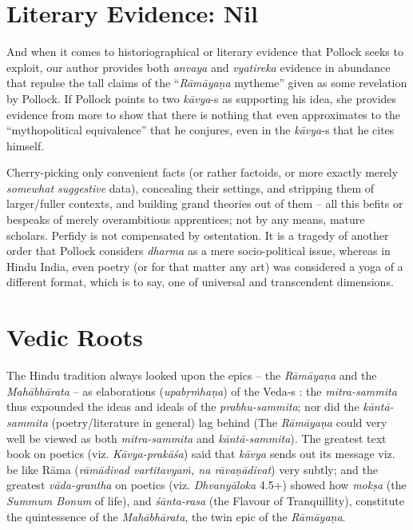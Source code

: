 \section*{Literary Evidence: Nil}

And when it comes to historiographical or literary evidence that Pollock seeks to exploit, our author provides both {\sl anvaya} and {\sl vyatireka} evidence in abundance that repulse the tall claims of  the “{\sl Rāmāyaṇa} mytheme” given as some revelation by Pollock. If Pollock points to two {\sl kāvya}-s as supporting his idea, she provides evidence from more to show that there is nothing that even approximates to the “mythopolitical equivalence” that he conjures, even in the {\sl kāvya}-s that he cites himself.

Cherry-picking only convenient facts (or rather factoids, or more exactly merely {\sl somewhat suggestive} data), concealing their settings, and stripping them of larger/fuller contexts, and building grand theories out of them -- all this befits or bespeaks of merely overambitious apprentices; not by any means, mature scholars. Perfidy is not compensated by ostentation. It is a tragedy of another order that Pollock considers {\sl dharma} as a mere socio-political issue, whereas in Hindu India, even poetry (or for that matter any art) was considered a yoga of a different format, which is to say, one of universal and transcendent dimensions. 

\section*{Vedic Roots}

The Hindu tradition always looked upon the epics -- the {\sl Rāmāyaṇa} and the {\sl Mahābhārata} -- as elaborations ({\sl upabṛṁhaṇa}) of the Veda-s : the {\sl mitra-sammita} thus expounded the ideas and ideals  of the {\sl prabhu-sammita}; nor did the {\sl kāntā-sammita} (poetry/literature in general) lag behind (The {\sl Rāmāyaṇa} could very well be viewed as both {\sl mitra-sammita} and {\sl kāntā-sammita}). The greatest text book on poetics (viz. {\sl Kāvya-prakāśa}) said that {\sl kāvya} sends out its message viz. be like Rāma ({\sl rāmādivad vartitavyaṁ, na rāvaṇādivat}) very subtly; and the greatest {\sl vāda-grantha} on poetics (viz. {\sl Dhvanyāloka} 4.5+) showed how {\sl mokṣa} (the {\sl Summum Bonum} of life), and {\sl śānta-rasa}  (the Flavour of Tranquillity), constitute the quintessence of the {\sl Mahābhārata}, the twin epic of the {\sl Rāmāyaṇa}.

